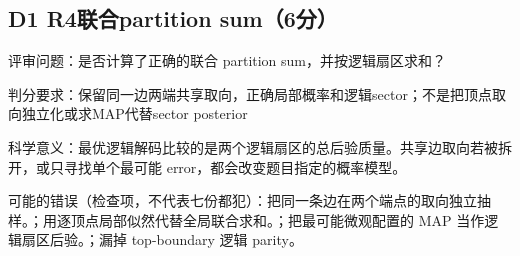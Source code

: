\documentclass[11pt,a4paper]{article}
\begin{document}
\subsection{D1 R4联合partition sum（6分）}
\label{aspect:D1}
评审问题：是否计算了正确的联合 partition sum，并按逻辑扇区求和？

判分要求：保留同一边两端共享取向，正确局部概率和逻辑sector；不是把顶点取向独立化或求MAP代替sector posterior

科学意义：最优逻辑解码比较的是两个逻辑扇区的总后验质量。共享边取向若被拆开，或只寻找单个最可能 error，都会改变题目指定的概率模型。

可能的错误（检查项，不代表七份都犯）：把同一条边在两个端点的取向独立抽样。；用逐顶点局部似然代替全局联合求和。；把最可能微观配置的 MAP 当作逻辑扇区后验。；漏掉 top-boundary 逻辑 parity。
\end{document}
